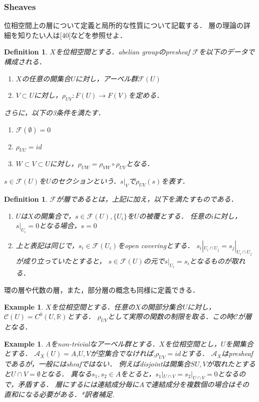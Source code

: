 \documentclass{ujarticle}
\newtheorem{dfn}[thm]{Definition}
\newtheorem{epl}[thm]{Example}
\begin{document}
\subsubsection{Sheaves}
\label{subs:Sheaves}
位相空間上の層について定義と局所的な性質について記載する．
層の理論の詳細を知りたい人は[40]などを参照せよ．

\begin{dfn}
 $X$を位相空間とする．abelian groupのpresheaf $\mathcal{F}$を以下のデータで構成される．
 \begin{enumerate}
   \item $X$の任意の開集合$U$に対し，アーベル群$\mathcal{F}(U)$
   \item $V \subset U$に対し，$\rho_{UV}:F(U) \to F(V)$を定める．
 \end{enumerate}
 さらに，以下の3条件を満たす．
 \begin{enumerate}
   \item $\mathcal{F}(\emptyset)=0$
   \item $\rho_{UU}=id$
   \item $W \subset V \subset U$に対し，$\rho_{UW}=\rho_{VW} \circ \rho_{UV}$となる．
 \end{enumerate}
 $s \in \mathcal{F}(U)$を$U$のセクションという．$s|_{V}$で$\rho_{UV}(s)$を表す．
\end{dfn}
\begin{dfn}
 $\mathcal{F}$が層であるとは，上記に加え，以下を満たすものである．
 \begin{enumerate}
   \item $U$は$X$の開集合で，$s \in \mathcal{F}(U),\{U_i\}$を$U$の被覆とする．
   任意の$i$に対し，$s|_{U_i}=0$となる場合，$s=0$
   \item 上と表記は同じで，$s_i \in \mathcal{F}(U_i)$をopen coveringとする．
   $s_i|_{U_i \cap U_j} = s_j|_{U_i \cap U_j}$が成り立っていたとすると，
   $s \in \mathcal{F}(U)$の元で$s|_{U_i}=s_i$となるものが取れる．
 \end{enumerate}
\end{dfn}
環の層や代数の層，また，部分層の概念も同様に定義できる．

\begin{epl}
 $X$を位相空間とする．任意の$X$の開部分集合$U$に対し，$\mathcal{C}(U)=C^0(U,\mathbb{R})$とする．
 $\rho_{UV}$として実際の関数の制限を取る．この時$\mathcal{C}$が層となる．
\end{epl}

\begin{epl}
 $A$をnon-trivialなアーベル群とする．$X$を位相空間とし，$U$を開集合とする．
 $\mathcal{A}_{X}(U)=A$,$U,V$が空集合でなければ,$\rho_{UV}=id$とする．
 $\mathcal{A}_X$はpresheafであるが，一般にはsheafではない．
 例えばdisjointは開集合$SU,V$が取れたとすると$U \cap V =\emptyset$となる．
 異なる$s_1,s_2 \in A$をとると，$s_1|_{U\cap V}=s_2|_{U \cap V}=0$となるので，矛盾する．
 層にするには連結成分毎に$A$で連結成分を複数個の場合はその直和になる必要がある．*訳者補足.
\end{epl}
\end{document}

